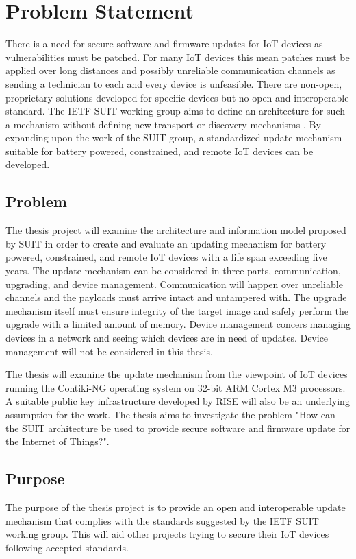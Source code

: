 \documentclass[0-thesis.tex]{subfiles}
\begin{document}
\section{Problem Statement}
There is a need for secure software and firmware updates for IoT devices as
vulnerabilities must be patched. For many IoT devices this mean patches must be applied
over long distances and possibly unreliable communication channels as sending a technician
to each and every device is unfeasible. There are non-open, proprietary solutions
developed for specific devices but no open and interoperable standard. The IETF SUIT
working group aims to define an architecture for such a mechanism without defining new
transport or discovery mechanisms \parencite{suit}. By expanding upon the work of the SUIT
group, a standardized update mechanism suitable for battery powered, constrained, and
remote IoT devices can be developed.

\subsection{Problem}
The thesis project will examine the architecture and information model proposed by SUIT in
order to create and evaluate an updating mechanism for battery powered, constrained, and
remote IoT devices with a life span exceeding five years. The update mechanism can be
considered in three parts, communication, upgrading, and device management. Communication
will happen over unreliable channels and the payloads must arrive intact and untampered
with. The upgrade mechanism itself must ensure integrity of the target image and safely
perform the upgrade with a limited amount of memory. Device management concers managing
devices in a network and seeing which devices are in need of updates. Device management
will not be considered in this thesis.

The thesis will examine the update mechanism from the viewpoint of IoT devices running the
Contiki-NG operating system on 32-bit ARM Cortex M3 processors. A suitable public key
infrastructure developed by RISE will also be an underlying assumption for the work. The
thesis aims to investigate the problem "How can the SUIT architecture be used to provide
secure software and firmware update for the Internet of Things?".

\subsection{Purpose}
The purpose of the thesis project is to provide an open and interoperable update mechanism
that complies with the standards suggested by the IETF SUIT working group. This will aid
other projects trying to secure their IoT devices following accepted standards.
\end{document}
